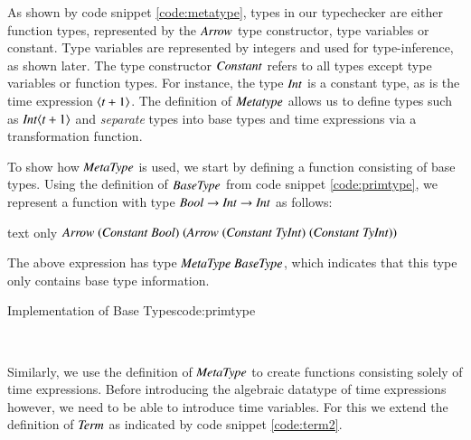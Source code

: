 As shown by code snippet \ref{code:metatype}, types in our typechecker are either function types, represented by the \ensuremath{\Conid{Arrow}} type constructor, type variables or constant.
Type variables are represented by integers and used for type-inference, as shown later.
The type constructor \ensuremath{\Conid{Constant}} refers to all types except type variables or function types.
For instance, the type \ensuremath{\Conid{Int}} is a constant type, as is the time expression \ensuremath{\langle\Varid{t}\mathbin{+}\mathrm{1}\rangle}.
The definition of \ensuremath{\Conid{Metatype}} allows us to define types such as \ensuremath{\Conid{Int}\langle\Varid{t}\mathbin{+}\mathrm{1}\rangle} and \textit{separate} types into base types and time expressions via a transformation function.

To show how \ensuremath{\Conid{MetaType}} is used, we start by defining a function consisting of base types.
Using the definition of \ensuremath{\Conid{BaseType}} from code snippet \ref{code:primtype}, we represent a function with type \ensuremath{\Conid{Bool}\to \Conid{Int}\to \Conid{Int}} as follows:
\begin{changemargin}{1cm}{0cm}
\begin{expansionno}{text only}
\ensuremath{\Conid{Arrow}\;(\Conid{Constant}\;\Conid{Bool})\;(\Conid{Arrow}\;(\Conid{Constant}\;\Conid{TyInt})\;(\Conid{Constant}\;\Conid{TyInt}))}
\end{expansionno}
\end{changemargin}
The above expression has type \ensuremath{\Conid{MetaType}\;\Conid{BaseType}}, which indicates that this type only contains base type information.

\begin{texexptitled}{Implementation of Base Types}{code:primtype}
\begin{hscode}\SaveRestoreHook
{}%
%
%
%
%
\>[B]{}\;\<[16]%
\>[16]{}\mathrel{=}{}\<[16E]%
\>[20]{}\<[E]%
\\
\>[16]{}\mid {}\<[16E]%
\>[20]{}\<[E]%
\ColumnHook
\end{hscode}\resethooks
\end{texexptitled}

Similarly, we use the definition of \ensuremath{\Conid{MetaType}} to create functions consisting solely of time expressions.
Before introducing the algebraic datatype of time expressions however, we need to be able to introduce time variables.
For this we extend the definition of \ensuremath{\Conid{Term}} as indicated by code snippet \ref{code:term2}.

